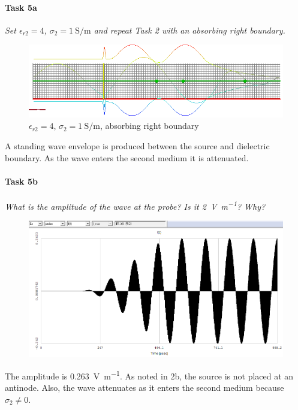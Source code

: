 \paragraph{Task 5a} \textit{Set $\epsilon_{r2} = 4$, $\sigma_2 = \SI{1}{\siemens\per\meter}$ and repeat Task 2 with an absorbing right boundary.}
\begin{figure}[tbph]
	\centering
	\includegraphics[width=0.95\linewidth]{graphics/Task2-5a-Standing}
	\caption{$\epsilon_{r2} = 4$, $\sigma_2 = \SI{1}{\siemens\per\meter}$, absorbing right boundary}
	\label{fig:Task2-5a-Standing}
\end{figure}

A standing wave envelope is produced between the source and dielectric boundary.
As the wave enters the second medium it is attenuated.

\paragraph{Task 5b} \textit{What is the amplitude of the wave at the probe? Is it \SI{2}{\volt\per\meter}? Why?}
\begin{figure}[tbph]
	\centering
	\includegraphics[width=0.6\linewidth]{graphics/Task2-5b-Amplitude}
\end{figure}

The amplitude is \SI{0.263}{\volt\per\meter}.
As noted in 2b, the source is not placed at an antinode.
Also, the wave attenuates as it enters the second medium because $\sigma_2 \ne 0$.


